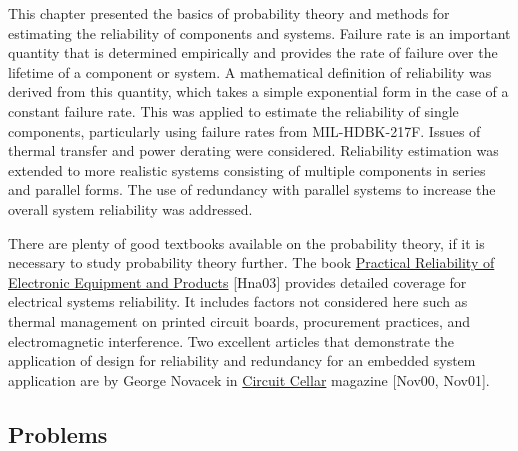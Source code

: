 This chapter presented the basics of probability theory and methods for
estimating the reliability of components and systems. Failure rate is an
important quantity that is determined empirically and provides the rate
of failure over the lifetime of a component or system. A mathematical
definition of reliability was derived from this quantity, which takes a
simple exponential form in the case of a constant failure rate. This was
applied to estimate the reliability of single components, particularly
using failure rates from MIL-HDBK-217F. Issues of thermal transfer and
power derating were considered. Reliability estimation was extended to
more realistic systems consisting of multiple components in series and
parallel forms. The use of redundancy with parallel systems to increase
the overall system reliability was addressed.

There are plenty of good textbooks available on the probability theory,
if it is necessary to study probability theory further. The book
\ul{Practical Reliability of Electronic Equipment and Products}
{[}Hna03{]} provides detailed coverage for electrical systems
reliability. It includes factors not considered here such as thermal
management on printed circuit boards, procurement practices, and
electromagnetic interference. Two excellent articles that demonstrate
the application of design for reliability and redundancy for an embedded
system application are by George Novacek in \ul{Circuit Cellar} magazine
{[}Nov00, Nov01{]}.

\subsection{Problems}\label{problems}

